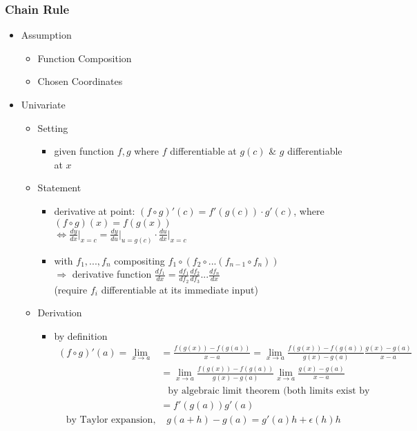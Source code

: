 \subsubsection{Chain Rule}
\begin{itemize}
\item Assumption
	\begin{itemize}
	\item Function Composition
	\item Chosen Coordinates
	\end{itemize}
\item Univariate
	\begin{itemize}
	\item Setting
		\begin{itemize}
		\item given function $f, g$ where $f$ differentiable at $g(c)$ \& $g$ differentiable at $x$
		\end{itemize}
	\item Statement
		\begin{itemize}
		\item derivative at point: $(f\circ g)'(c) = f'(g(c))\cdot g'(c)$, where $(f\circ g)(x) = f(g(x))$ \\
		$\Leftrightarrow \frac{dy}{dx}\big|_{x=c} = \frac{dy}{du}\big|_{u=g(c)}\cdot \frac{du}{dx}\big|_{x=c}$
		\item with $f_1,...,f_n$ compositing $f_1\circ(f_2\circ ...(f_{n-1}\circ f_n))$ \\
		$\Rightarrow$ derivative function $\frac{df_1}{dx} = \frac{df_1}{df_2}\frac{df_2}{df_3}...\frac{df_n}{dx}$ \\ 
		(require $f_i$ differentiable at its immediate input)
		\end{itemize}
	\item Derivation
		\begin{itemize}
		\item by definition \begin{align*} \displaystyle (f\circ g)'(a)=\lim_{x\rightarrow a} &=\frac{f(g(x))-f(g(a))}{x-a} = \lim_{x\rightarrow a}\frac{f(g(x))-f(g(a))}{g(x)-g(a)}\frac{g(x)-g(a)}{x-a} \\
		&= \lim_{x\rightarrow a}\frac{f(g(x))-f(g(a))}{g(x)-g(a)}\lim_{x\rightarrow a}\frac{g(x)-g(a)}{x-a} \\
		&\phantom{=} \text{by algebraic limit theorem (both limits exist by assumption)} \\
		&= f'(g(a))g'(a)\end{align*}
		\Item \begin{align*} \text{by Taylor expansion, } &g(a+h)-g(a)=g'(a)h+\epsilon(h)h \\

\end{align*}
\end{itemize}
\end{itemize}
\end{itemize}
